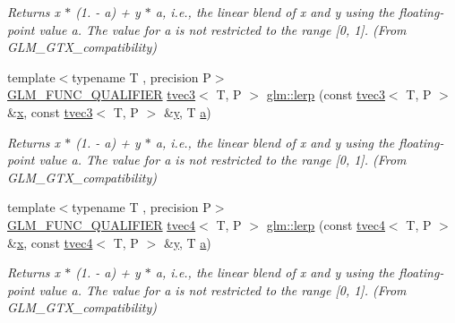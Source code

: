 \begin{DoxyCompactItemize}
\begin{DoxyCompactList}\small\item\em Returns x $\ast$ (1. -\/ a) + y $\ast$ a, i.\+e., the linear blend of x and y using the floating-\/point value a. The value for a is not restricted to the range \mbox{[}0, 1\mbox{]}. (From G\+L\+M\+\_\+\+G\+T\+X\+\_\+compatibility) \end{DoxyCompactList}\item 
{\footnotesize template$<$typename T , precision P$>$ }\\\mbox{\hyperlink{setup_8hpp_a33fdea6f91c5f834105f7415e2a64407}{G\+L\+M\+\_\+\+F\+U\+N\+C\+\_\+\+Q\+U\+A\+L\+I\+F\+I\+ER}} \mbox{\hyperlink{structglm_1_1tvec3}{tvec3}}$<$ T, P $>$ \mbox{\hyperlink{group__gtx__compatibility_gaf4c885ac72b8879b05777cb516c555c9}{glm\+::lerp}} (const \mbox{\hyperlink{structglm_1_1tvec3}{tvec3}}$<$ T, P $>$ \&\mbox{\hyperlink{glad_8h_a92d0386e5c19fb81ea88c9f99644ab1d}{x}}, const \mbox{\hyperlink{structglm_1_1tvec3}{tvec3}}$<$ T, P $>$ \&\mbox{\hyperlink{glad_8h_a66ddd433d2cacfe27f5906b7e86faeed}{y}}, T \mbox{\hyperlink{glad_8h_ac8729153468b5dcf13f971b21d84d4e5}{a}})
\begin{DoxyCompactList}\small\item\em Returns x $\ast$ (1. -\/ a) + y $\ast$ a, i.\+e., the linear blend of x and y using the floating-\/point value a. The value for a is not restricted to the range \mbox{[}0, 1\mbox{]}. (From G\+L\+M\+\_\+\+G\+T\+X\+\_\+compatibility) \end{DoxyCompactList}\item 
{\footnotesize template$<$typename T , precision P$>$ }\\\mbox{\hyperlink{setup_8hpp_a33fdea6f91c5f834105f7415e2a64407}{G\+L\+M\+\_\+\+F\+U\+N\+C\+\_\+\+Q\+U\+A\+L\+I\+F\+I\+ER}} \mbox{\hyperlink{structglm_1_1tvec4}{tvec4}}$<$ T, P $>$ \mbox{\hyperlink{group__gtx__compatibility_ga363d5d069d31a6c2cdd1e9589dde4a60}{glm\+::lerp}} (const \mbox{\hyperlink{structglm_1_1tvec4}{tvec4}}$<$ T, P $>$ \&\mbox{\hyperlink{glad_8h_a92d0386e5c19fb81ea88c9f99644ab1d}{x}}, const \mbox{\hyperlink{structglm_1_1tvec4}{tvec4}}$<$ T, P $>$ \&\mbox{\hyperlink{glad_8h_a66ddd433d2cacfe27f5906b7e86faeed}{y}}, T \mbox{\hyperlink{glad_8h_ac8729153468b5dcf13f971b21d84d4e5}{a}})
\begin{DoxyCompactList}\small\item\em Returns x $\ast$ (1. -\/ a) + y $\ast$ a, i.\+e., the linear blend of x and y using the floating-\/point value a. The value for a is not restricted to the range \mbox{[}0, 1\mbox{]}. (From G\+L\+M\+\_\+\+G\+T\+X\+\_\+compatibility) \end{DoxyCompactList}\item 

\end{DoxyCompactItemize}
